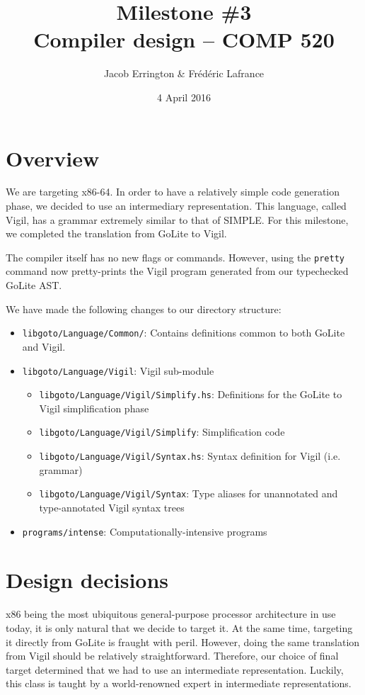 \documentclass[letterpaper,11pt]{article}
\title{Milestone \#3\\Compiler design -- COMP 520}
\author{Jacob Errington \& Fr\'ed\'eric Lafrance}
\date{4 April 2016}
\begin{document}
\maketitle

\section{Overview}
We are targeting x86-64. In order to have a relatively simple code generation phase, we decided to use an intermediary representation. This language, called Vigil, has a grammar extremely similar to that of SIMPLE. For this milestone, we completed the translation from GoLite to Vigil.

The compiler itself has no new flags or commands. However, using the \texttt{pretty} command now pretty-prints the Vigil program generated from our typechecked GoLite AST.

We have made the following changes to our directory structure:
\begin{itemize}
\item \texttt{libgoto/Language/Common/}: Contains definitions common to both GoLite and Vigil.
\item \texttt{libgoto/Language/Vigil}: Vigil sub-module
	\begin{itemize}
	\item \texttt{libgoto/Language/Vigil/Simplify.hs}: Definitions for the GoLite to Vigil simplification phase
	\item \texttt{libgoto/Language/Vigil/Simplify}: Simplification code
	\item \texttt{libgoto/Language/Vigil/Syntax.hs}: Syntax definition for Vigil (i.e. grammar)
	\item \texttt{libgoto/Language/Vigil/Syntax}: Type aliases for unannotated and type-annotated Vigil syntax trees
	\end{itemize}
\item \texttt{programs/intense}: Computationally-intensive programs
\end{itemize}

\section{Design decisions}
x86 being the most ubiquitous general-purpose processor architecture in use today, it is only natural that we decide to target it. At the same time, targeting it directly from GoLite is fraught with peril. However, doing the same translation from Vigil should be relatively straightforward. Therefore, our choice of final target determined that we had to use an intermediate representation. Luckily, this class is taught by a world-renowned expert in intermediate representations.
\end{document}
